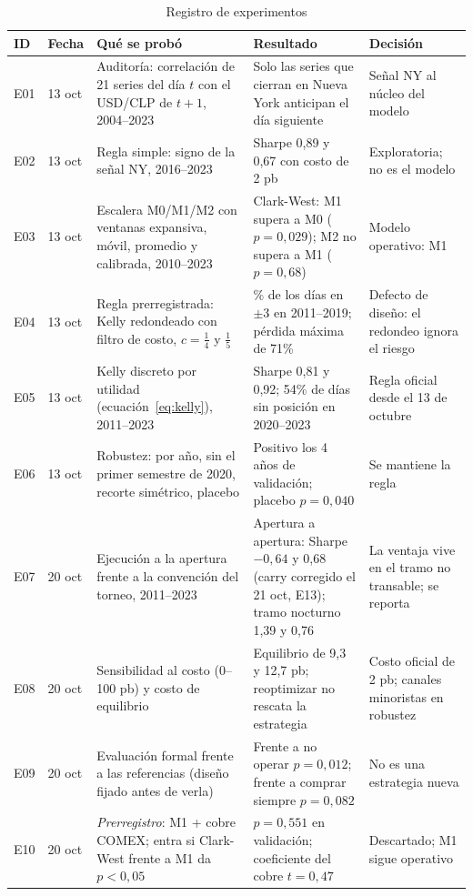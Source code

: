 \documentclass[11pt,a4paper]{article}
\begin{document}
\begin{table}[htbp]\centering\scriptsize
\caption{Registro de experimentos}\label{tab:registro}
\begin{tabularx}{\textwidth}{@{}l l >{\raggedright\arraybackslash}X >{\raggedright\arraybackslash}X >{\raggedright\arraybackslash}X@{}}
\toprule
ID & Fecha & Qué se probó & Resultado & Decisión \\
\midrule
E01 & 13 oct & Auditoría: correlación de 21 series del día \(t\) con el USD/CLP de \(t+1\), 2004--2023 & Solo las series que cierran en Nueva York anticipan el día siguiente & Señal NY al núcleo del modelo \\
E02 & 13 oct & Regla simple: signo de la señal NY, 2016--2023 & Sharpe 0,89 y 0,67 con costo de 2 pb & Exploratoria; no es el modelo \\
E03 & 13 oct & Escalera M0/M1/M2 con ventanas expansiva, móvil, promedio y calibrada, 2010--2023 & Clark-West: M1 supera a M0 (\(p=0{,}029\)); M2 no supera a M1 (\(p=0{,}68\)) & Modelo operativo: M1 \\
E04 & 13 oct & Regla prerregistrada: Kelly redondeado con filtro de costo, \(c=\tfrac14\) y \(\tfrac15\) & 87\% de los días en \(\pm3\) en 2011--2019; pérdida máxima de 71\% & Defecto de diseño: el redondeo ignora el riesgo \\
E05 & 13 oct & Kelly discreto por utilidad (ecuación~\ref{eq:kelly}), 2011--2023 & Sharpe 0,81 y 0,92; 54\% de días sin posición en 2020--2023 & Regla oficial desde el 13 de octubre \\
E06 & 13 oct & Robustez: por año, sin el primer semestre de 2020, recorte simétrico, placebo & Positivo los 4 años de validación; placebo \(p=0{,}040\) & Se mantiene la regla \\
E07 & 20 oct & Ejecución a la apertura frente a la convención del torneo, 2011--2023 & Apertura a apertura: Sharpe $-0{,}64$ y 0,68 (carry corregido el 21 oct, E13); tramo nocturno 1,39 y 0,76 & La ventaja vive en el tramo no transable; se reporta \\
E08 & 20 oct & Sensibilidad al costo (0--100 pb) y costo de equilibrio & Equilibrio de 9,3 y 12,7 pb; reoptimizar no rescata la estrategia & Costo oficial de 2 pb; canales minoristas en robustez \\
E09 & 20 oct & Evaluación formal frente a las referencias (diseño fijado antes de verla) & Frente a no operar \(p=0{,}012\); frente a comprar siempre \(p=0{,}082\) & No es una estrategia nueva \\
E10 & 20 oct & \emph{Prerregistro}: M1 + cobre COMEX; entra si Clark-West frente a M1 da \(p<0{,}05\) & \(p=0{,}551\) en validación; coeficiente del cobre \(t=0{,}47\) & Descartado; M1 sigue operativo \\

\end{tabularx}
\end{table}
\end{document}

